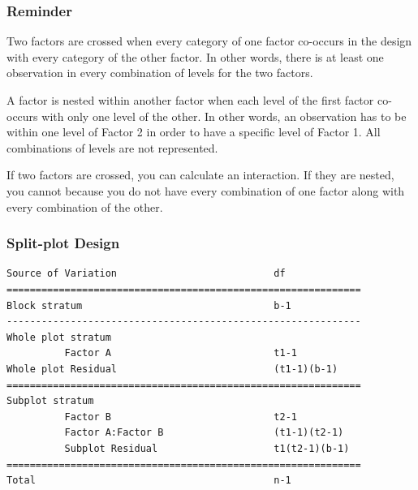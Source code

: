 \begin{frame}\frametitle{Reminder}
Two factors are crossed when every category of one factor co-occurs in the
design with every category of the other factor. In other words, there is at
least one observation in every combination of levels for the two factors.

A factor is nested within another factor when each level of the first factor
co-occurs with only one level of the other. In other words, an observation has
to be within one level of Factor 2 in order to have a specific level of Factor
1. All combinations of levels are not represented.

If two factors are crossed, you can calculate an interaction. If they are
nested, you cannot because you do not have every combination of one factor
along with every combination of the other.
\end{frame}




\begin{frame}[fragile]\frametitle{Split-plot Design}
\begin{verbatim}
Source of Variation                           df
=============================================================
Block stratum                                 b-1
-------------------------------------------------------------
Whole plot stratum
          Factor A                            t1-1
Whole plot Residual                           (t1-1)(b-1)
=============================================================
Subplot stratum
          Factor B                            t2-1
          Factor A:Factor B                   (t1-1)(t2-1)
          Subplot Residual                    t1(t2-1)(b-1)
=============================================================
Total                                         n-1
\end{verbatim}
\end{frame}




